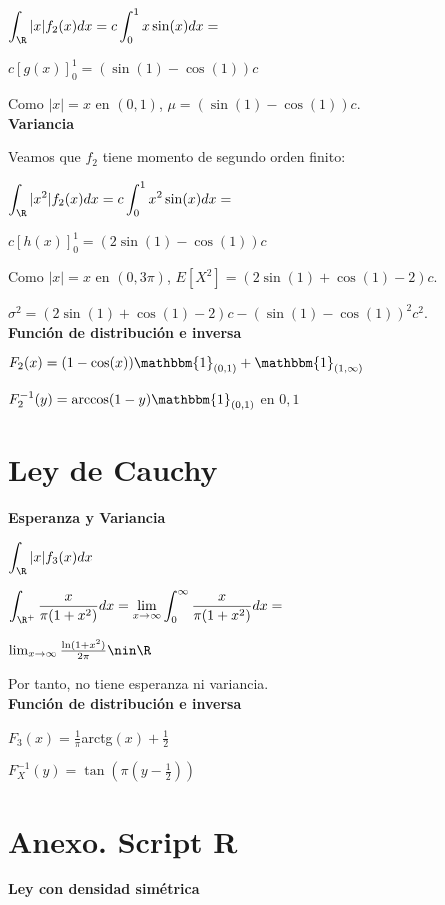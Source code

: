 \documentclass[a5paper]{article}
\newcommand{\ind}[1]{\mathbbm{1}_{#1}}
\begin{document}
$\integral{ |x|f_2(x) }{ dx }{ \R } = c \integral{ x \sin(x) }{ dx }{ 0 }[ 1 ] = $

$ c[g(x)]_0^1 = (\sin(1) - \cos(1)) c$

Como $|x| = x$ en $(0,1)$, $\mu = (\sin(1) - \cos(1)) c$.\\

{\bf Variancia }

Veamos que $f_2$ tiene momento de segundo orden finito:

$\integral{ |x^2|f_2(x) }{ dx }{ \R } = c \integral{ x^2 \sin(x) }{ dx }{ 0 }[ 1 ] = $

$ c [h(x)]_0^1 = (2\sin(1) - \cos(1))c $

Como $|x| = x$ en $(0,3\pi)$, $E[X^2] = (2\sin(1)+\cos(1)-2)c$.

$\sigma^2 = (2\sin(1)+\cos(1)-2)c - (\sin(1) - \cos(1))^2 c^2$.\\

{\bf Función de distribución e inversa}

$F_2(x) = (1-\cos(x))\ind{(0,1)}+\ind{(1,\infty)}$

$F_2^{-1}(y) = \arccos(1-y)\ind{(0,1)}$ en ${0,1}$

\section{ Ley de Cauchy }

{\bf Esperanza y Variancia}

$\integral{ |x|f_3(x) }{ dx }{ \R }$

$\integral{ \frac{ x }{ \pi(1+x^2) } }{ dx }{ \R^+ } = \lim_{x\to\infty} \integral{ \frac{ x }{ \pi(1+x^2) } }{ dx }{ 0 }[ \infty ] = $

$ \lim_{x\to\infty} \frac{ \ln(1+x^2) }{ 2\pi } \nin \R $

Por tanto, no tiene esperanza ni variancia.\\

{\bf Función de distribución e inversa}

$F_3(x) = \frac{ 1 }{ \pi }$arctg$(x) + \frac{ 1 }{ 2 }$

$F_X^{-1}(y) = \tan(\pi(y- \frac{ 1 }{ 2 }))$

\newpage



\section{ Anexo. Script R}

{\bf Ley con densidad simétrica}
\end{document}
